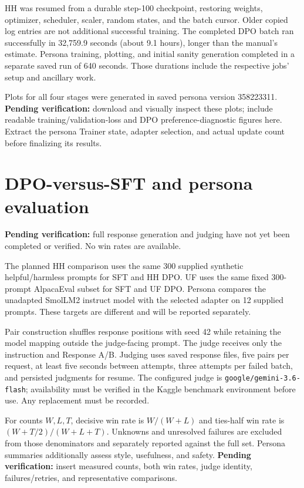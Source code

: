 \documentclass[10pt,a4paper]{article}
\newcommand{\pending}[1]{\textcolor{red!65!black}{\textbf{Pending verification:} #1}}
\begin{document}
HH was resumed from a durable step-100 checkpoint, restoring weights, optimizer, scheduler, scaler, random states, and the batch cursor. Older copied log entries are not additional successful training. The completed DPO batch ran successfully in 32,759.9 seconds (about 9.1 hours), longer than the manual's estimate. Persona training, plotting, and initial sanity generation completed in a separate saved run of 640 seconds. Those durations include the respective jobs' setup and ancillary work.

Plots for all four stages were generated in saved persona version 358223311. \pending{download and visually inspect these plots; include readable training/validation-loss and DPO preference-diagnostic figures here. Extract the persona Trainer state, adapter selection, and actual update count before finalizing its results.}

\section{DPO-versus-SFT and persona evaluation}
\pending{full response generation and judging have not yet been completed or verified. No win rates are available.}

The planned HH comparison uses the same 300 supplied synthetic helpful/harmless prompts for SFT and HH DPO. UF uses the same fixed 300-prompt AlpacaEval subset for SFT and UF DPO. Persona compares the unadapted SmolLM2 instruct model with the selected adapter on 12 supplied prompts. These targets are different and will be reported separately.

Pair construction shuffles response positions with seed 42 while retaining the model mapping outside the judge-facing prompt. The judge receives only the instruction and Response A/B. Judging uses saved response files, five pairs per request, at least five seconds between attempts, three attempts per failed batch, and persisted judgments for resume. The configured judge is \texttt{google/gemini-3.6-flash}; availability must be verified in the Kaggle benchmark environment before use. Any replacement must be recorded.

For counts $W,L,T$, decisive win rate is $W/(W+L)$ and ties-half win rate is $(W+T/2)/(W+L+T)$. Unknowns and unresolved failures are excluded from those denominators and separately reported against the full set. Persona summaries additionally assess style, usefulness, and safety. \pending{insert measured counts, both win rates, judge identity, failures/retries, and representative comparisons.}
\end{document}
